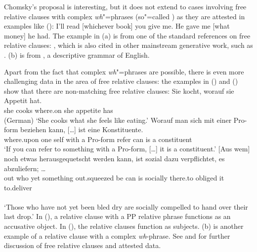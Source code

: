 \documentclass[output=paper
                ,modfonts
                ,nonflat
	        ,collection
	        ,collectionchapter
	        ,collectiontoclongg
 	        ,biblatex
                ,babelshorthands
                ,newtxmath
                ,draftmode
                ,colorlinks, citecolor=brown
]{./langsci/langscibook}
\begin{document}
Chomsky's proposal is interesting, but it does not extend to cases involving free relative clauses
with complex \emph{wh}"=phrases (so"=called ) as they are attested in examples like
(): 
\eal
\ex I'll read [whichever book] you give me.
\ex He gave me [what money] he had.
\zl
The example in (a) is from one of the standard references on free relative clauses:
, which is also cited in other mainstream generative work, such as
. (b) is from , a descriptive grammar of English.

Apart from the fact that complex \emph{wh}"=phrases are possible, there is even more challenging data in the area of
free relative clauses: the examples in () and () show that there are non-matching free
relative clauses:
\ea
\gll Sie kocht, worauf   sie Appetit  hat.\footnotemark\\
     she cooks  where.on she appetite has\\\hfill(German)
\glt `She cooks what she feels like eating.'
\z
\eal
\ex
\gll Worauf man sich mit einer Pro-form beziehen kann, [\ldots]  ist eine Kon\-sti\-tu\-en\-te.\footnotemark\\
     where.upon one self with a Pro-form  refer   can  {}        is  a    constituent\\
\glt `If you can refer to something with a Pro-form, [\ldots] it is a constituent.'
\ex
\gll {}[Aus wem] noch etwas herausgequetscht werden kann, ist sozial dazu ver\-pflich\-tet, es
abzuliefern; \ldots\label{bsp-droste}\footnotemark\\
  \spacebr{}out who yet something out.squeezed be can is socially there.to obliged it to.deliver\\
\\
\glt `Those who have not yet been bled dry are socially compelled to hand over their last drop.'
\zl
In (), a relative clause with a PP relative phrase functions as an accusative object. In
(), the relative clauses function as subjects. (b) is another example of a relative
clause with a complex \emph{wh}-phrase. See \citet{Bausewein90} and \citet{Mueller99b} for further discussion of free relative
clauses and attested data.
\end{document}
